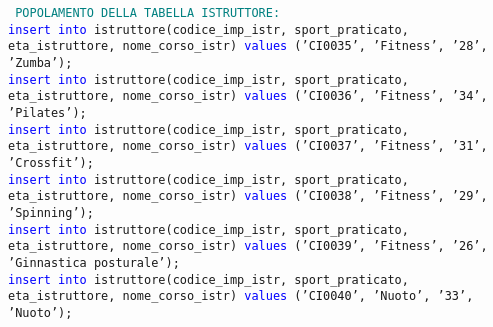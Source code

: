\documentclass{article}
\begin{document}
    \begin{flushleft}
        \texttt{
        \textcolor{teal}{POPOLAMENTO DELLA TABELLA ISTRUTTORE:} \\
        \hspace*{0.5em}\textcolor{blue}{insert into} istruttore(codice\_imp\_istr, sport\_praticato, eta\_istruttore, \hspace*{0.5em}nome\_corso\_istr) \textcolor{blue}{values} ('CI0035', 'Fitness', '28', 'Zumba'); \\
        \vspace{2mm}
        \hspace*{0.5em}\textcolor{blue}{insert into} istruttore(codice\_imp\_istr, sport\_praticato, eta\_istruttore, \hspace*{0.5em}nome\_corso\_istr) \textcolor{blue}{values} ('CI0036', 'Fitness', '34', 'Pilates'); \\
        \vspace{2mm}
        \hspace*{0.5em}\textcolor{blue}{insert into} istruttore(codice\_imp\_istr, sport\_praticato, eta\_istruttore, \hspace*{0.5em}nome\_corso\_istr) \textcolor{blue}{values} ('CI0037', 'Fitness', '31', 'Crossfit'); \\
        \vspace{2mm}
        \hspace*{0.5em}\textcolor{blue}{insert into} istruttore(codice\_imp\_istr, sport\_praticato, eta\_istruttore, \hspace*{0.5em}nome\_corso\_istr) \textcolor{blue}{values} ('CI0038', 'Fitness', '29', 'Spinning'); \\
        \vspace{2mm}
        \hspace*{0.5em}\textcolor{blue}{insert into} istruttore(codice\_imp\_istr, sport\_praticato, eta\_istruttore, \hspace*{0.5em}nome\_corso\_istr) \textcolor{blue}{values} ('CI0039', 'Fitness', '26', 'Ginnastica posturale'); \\
        \vspace{2mm}
        \hspace*{0.5em}\textcolor{blue}{insert into} istruttore(codice\_imp\_istr, sport\_praticato, eta\_istruttore, \hspace*{0.5em}nome\_corso\_istr) \textcolor{blue}{values} ('CI0040', 'Nuoto', '33', 'Nuoto'); \\
        \vspace{2mm}
}
\end{flushleft}
\end{document}
